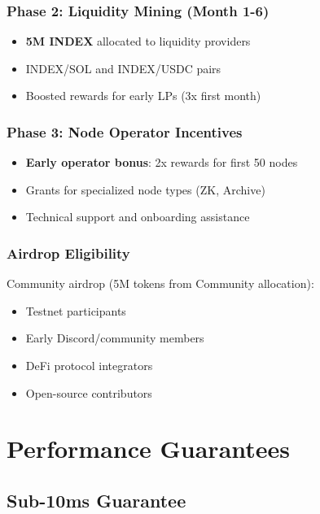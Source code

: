 \documentclass[12pt,a4paper]{article}
\begin{document}
\subsubsection{Phase 2: Liquidity Mining (Month 1-6)}
\begin{itemize}
    \item \textbf{5M INDEX} allocated to liquidity providers
    \item INDEX/SOL and INDEX/USDC pairs
    \item Boosted rewards for early LPs (3x first month)
\end{itemize}

\subsubsection{Phase 3: Node Operator Incentives}
\begin{itemize}
    \item \textbf{Early operator bonus}: 2x rewards for first 50 nodes
    \item Grants for specialized node types (ZK, Archive)
    \item Technical support and onboarding assistance
\end{itemize}

\subsubsection{Airdrop Eligibility}
Community airdrop (5M tokens from Community allocation):
\begin{itemize}
    \item Testnet participants
    \item Early Discord/community members
    \item DeFi protocol integrators
    \item Open-source contributors
\end{itemize}

\section{Performance Guarantees}

\subsection{Sub-10ms Guarantee}
\end{document}
